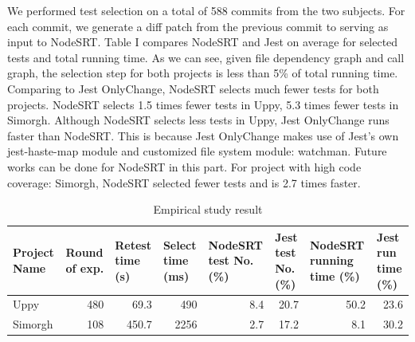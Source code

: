 \documentclass[10pt, conference]{IEEEtran}
\begin{document}
We performed test selection on a total of 588 commits from the two subjects. For each commit, we generate a diff patch from the previous commit to serving as input to NodeSRT. 
Table I compares NodeSRT and Jest on average for selected tests and total running time. As we can see, given file dependency graph and call graph, the selection step 
for both projects is less than 5\% of total running time. Comparing to Jest OnlyChange, NodeSRT
selects much fewer tests for both projects. NodeSRT selects 1.5 times fewer 
tests in Uppy, 5.3 times fewer tests in Simorgh. Although NodeSRT selects less tests in Uppy, Jest OnlyChange runs faster than NodeSRT. 
This is because Jest OnlyChange makes use of Jest's own jest-haste-map module and customized file system module: watchman. Future works can 
be done for NodeSRT in this part. For project with high code coverage: Simorgh, NodeSRT selected fewer tests and is 2.7 times faster. 
\begin{table}[htbp]
    \caption{Empirical study result}
    \centering
    \begin{tabular}{@{}p{2em}p{2.2em}p{2em}p{1.8em}p{3.5em}p{2em}p{3.5em}p{3em}@{}}
    \toprule
    \textbf{Project Name} & \textbf{Round of exp.}  & \textbf{Retest time (s)} & \textbf{Select time (ms)} & \textbf{NodeSRT test No. (\%)}    & \textbf{Jest test No. (\%)}       & \textbf{NodeSRT running time (\%)} & \textbf{Jest run time (\%)} \\ \midrule
    Uppy         & \multicolumn{1}{r}{480} & \multicolumn{1}{r}{69.3}  & \multicolumn{1}{r}{490} & \multicolumn{1}{r}{8.4} & \multicolumn{1}{r}{20.7} & \multicolumn{1}{r}{50.2}  &   \multicolumn{1}{r}{23.6} \\ 
    Simorgh      & \multicolumn{1}{r}{108} & \multicolumn{1}{r}{450.7} & \multicolumn{1}{r}{2256} & \multicolumn{1}{r}{2.7}& \multicolumn{1}{r}{17.2} & \multicolumn{1}{r}{8.1}   &  \multicolumn{1}{r}{30.2} \\ \bottomrule
    \end{tabular}
    \end{table}
\end{document}

